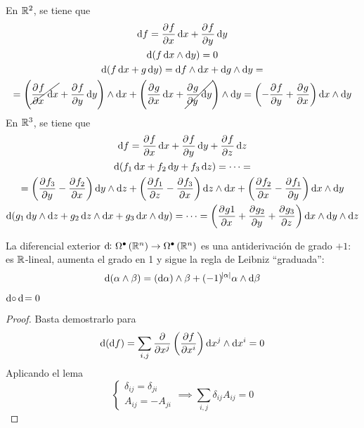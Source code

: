 \begin{example*}
    En $\mathbb{R}^2$, se tiene que
    \begin{gather*}
        \dif f = \pdv{f}{x} \dif x + \pdv{f}{y} \dif y \\
        \dif \left( f \dif x \wedge \dif y \right) = 0 \\
        \dif\left( f \dif x + g \dif y \right) = \dif f \wedge \dif x + \dif g \wedge \dif y =\\=
        \left( \cancel{\pdv{f}{x} \dif x} + \pdv{f}{y} \dif y \right) \wedge \dif x + \left( \pdv{g}{x} \dif x + \cancel{\pdv{g}{y} \dif y} \right)\wedge \dif y =
        \left( -\pdv{f}{y} + \pdv{g}{x} \right) \dif x \wedge \dif y
    \end{gather*}
    En $\mathbb{R}^3$, se tiene que
    \begin{gather*}
        \dif f = \pdv{f}{x} \dif x + \pdv{f}{y} \dif y + \pdv{f}{z} \dif z \\
        \dif \left( f_1 \dif x + f_2 \dif y + f_3 \dif z \right) = \cdots = \\ = \left( \pdv{f_3}{y} - \pdv{f_2}{x} \right)\dif y \wedge \dif z +
        \left( \pdv{f_1}{z} - \pdv{f_3}{x} \right) \dif z \wedge \dif x + \left( \pdv{f_2}{x} - \pdv{f_1}{y} \right)\dif x \wedge \dif y \\
        \dif \left( g_1 \dif y \wedge \dif z +  g_2 \dif z \wedge \dif x + g_3 \dif x \wedge \dif y \right) = \cdots =
        \left( \pdv{g1}{x} + \pdv{g_2}{y} + \pdv{g_3}{z} \right) \dif x \wedge \dif y \wedge \dif z
    \end{gather*}
\end{example*}

\begin{obs}
    La diferencial exterior $\dif \colon \Omega^\bullet \left( \real^n \right) \to \Omega^\bullet \left( \real^n \right)$ es una antiderivación de
    grado $+1$: es $\mathbb{R}$-lineal, aumenta el grado en 1 y sigue la regla de Leibniz ``graduada'':
    \[
        \dif \left( \alpha \wedge \beta \right) = \left( \dif \alpha \right) \wedge \beta + (-1)^{\abs{\alpha}} \alpha \wedge \dif \beta
    \]
\end{obs}

\begin{prop}\label{prop:d-cuadrado}
    $\dif \circ \dif = 0$
\end{prop}
\begin{proof}
    Basta demostrarlo para
    \[
        \dif \left( \dif f \right) = \sum_{i,j} \frac{\partial}{\partial x^j} \left( \frac{\partial f}{\partial x^i} \right) \dif x^j \wedge \dif x^i = 0
    \]
    Aplicando el lema
    \[
        \begin{cases}
            \delta_{ij} = \delta_{ji} \\ A_{ij} = - A_{ji}
        \end{cases} \implies
        \sum_{i,j} \delta_{ij} A_{ij} = 0
    \]
\end{proof}

